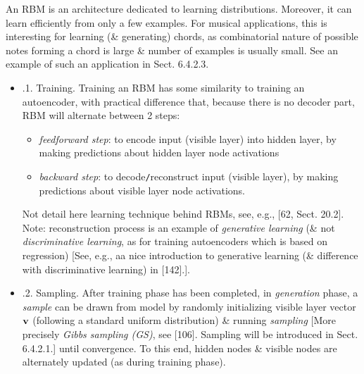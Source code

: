 \documentclass{article}
\begin{document}
\begin{itemize}
\begin{itemize}
		An RBM is an architecture dedicated to learning distributions. Moreover, it can learn efficiently from only a few examples. For musical applications, this is interesting for learning (\& generating) chords, as combinatorial nature of possible notes forming a chord is large \& number of examples is usually small. See an example of such an application in Sect. 6.4.2.3.
		\begin{itemize}
			\item {.1. Training.} Training an RBM has some similarity to training an autoencoder, with practical difference that, because there is no decoder part, RBM will alternate between 2 steps:
			\begin{itemize}
				\item {\it feedforward step}: to encode input (visible layer) into hidden layer, by making predictions about hidden layer node activations
				\item {\it backward step}: to decode{\tt/}reconstruct input (visible layer), by making predictions about visible layer node activations.
			\end{itemize}
			Not detail here learning technique behind RBMs, see, e.g., [62, Sect. 20.2]. Note: reconstruction process is an example of {\it generative learning} (\& not {\it discriminative learning}, as for training autoencoders which is based on regression) [See, e.g., aa nice introduction to generative learning (\& difference with discriminative learning) in [142].].
			\item {.2. Sampling.} After training phase has been completed, in {\it generation} phase, a {\it sample} can be drawn from model by randomly initializing visible layer vector ${\bf v}$ (following a standard uniform distribution) \& running {\it sampling} [More precisely {\it Gibbs sampling (GS)}, see [106]. Sampling will be introduced in Sect. 6.4.2.1.] until convergence. To this end, hidden nodes \& visible nodes are alternately updated (as during training phase).


\end{itemize}
\end{itemize}
\end{itemize}
\end{document}
